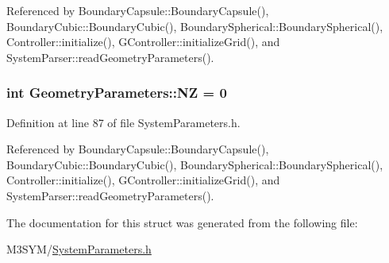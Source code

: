 Referenced by Boundary\+Capsule\+::\+Boundary\+Capsule(), Boundary\+Cubic\+::\+Boundary\+Cubic(), Boundary\+Spherical\+::\+Boundary\+Spherical(), Controller\+::initialize(), G\+Controller\+::initialize\+Grid(), and System\+Parser\+::read\+Geometry\+Parameters().

\hypertarget{structGeometryParameters_a01890a89021cabfc92ee2b8e23faef60}{
\subsubsection[{N\+Z}]{\setlength{\rightskip}{0pt plus 5cm}int Geometry\+Parameters\+::\+N\+Z = 0}}\label{structGeometryParameters_a01890a89021cabfc92ee2b8e23faef60}


Definition at line 87 of file System\+Parameters.\+h.



Referenced by Boundary\+Capsule\+::\+Boundary\+Capsule(), Boundary\+Cubic\+::\+Boundary\+Cubic(), Boundary\+Spherical\+::\+Boundary\+Spherical(), Controller\+::initialize(), G\+Controller\+::initialize\+Grid(), and System\+Parser\+::read\+Geometry\+Parameters().



The documentation for this struct was generated from the following file\+:\begin{DoxyCompactItemize}
\item 
M3\+S\+Y\+M/\hyperlink{SystemParameters_8h}{System\+Parameters.\+h}\end{DoxyCompactItemize}
